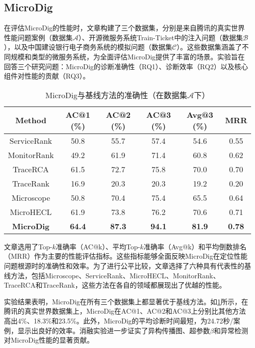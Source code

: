 \subsection{MicroDig}

在评估MicroDig的性能时，文章构建了三个数据集，分别是来自腾讯的真实世界性能问题案例（数据集$\mathcal{A}$）、开源微服务系统Train-Ticket中的注入问题（数据集$\mathcal{B}$），以及中国建设银行电子商务系统的模拟问题（数据集$\mathcal{C}$）。这些数据集涵盖了不同规模和类型的微服务系统，为全面评估MicroDig提供了丰富的场景。实验旨在回答三个研究问题：MicroDig的诊断准确性（RQ1）、诊断效率（RQ2）以及核心组件对性能的贡献（RQ3）。

\begin{table}[ht]
    \centering
    \caption{MicroDig与基线方法的准确性（在数据集$\mathcal{A}$下）}
    \label{table:the accuracy of microdig and the baseline methods A}
    \begin{tabular}{cccccc}
        \toprule
        \textbf{Method} & \textbf{AC@1 (\%)} & \textbf{AC@2 (\%)} & \textbf{AC@3 (\%)} & \textbf{Avg@3 (\%)} & \textbf{MRR} \\
        \midrule
        ServiceRank         & 50.8 & 55.7 & 57.4 & 54.6 & 0.55 \\
        MonitorRank         & 49.2 & 61.9 & 71.4 & 60.8 & 0.62 \\
        TraceRCA            & 61.5 & 72.7 & 75.8 & 70.0 & 0.70 \\
        TraceRank           & 16.9 & 20.3 & 20.3 & 19.2 & 0.20 \\
        Microscope          & 50.8 & 70.4 & 75.4 & 65.5 & 0.64 \\
        MicroHECL           & 61.9 & 73.8 & 76.2 & 70.6 & 0.71 \\
        \textbf{MicroDig}   & \textbf{64.4} & \textbf{87.3} & \textbf{94.1} & \textbf{81.9} & \textbf{0.78} \\
        \bottomrule
    \end{tabular}
\end{table}

文章选用了Top-$k$准确率（AC@k）、平均Top-$k$准确率（Avg@k）和平均倒数排名（MRR）作为主要的性能评估指标。这些指标能够全面反映MicroDig在定位性能问题根源时的准确性和效率。为了进行公平比较，文章选择了六种具有代表性的基线方法，包括Microscope、ServiceRank、MicroHECL、MonitorRank、TraceRCA和TraceRank，这些方法在各自的领域都展现出了优越的性能。

实验结果表明，MicroDig在所有三个数据集上都显著优于基线方法。如\cref{table:the accuracy of microdig and the baseline methods A}所示，在腾讯的真实世界数据集上，MicroDig在AC@1、AC@2和AC@3上分别比其他方法高出4\%、18.3\%和23.5\%。此外，MicroDig的平均诊断时间最短，为24.72秒/案例，显示出良好的效率。消融实验进一步证实了异构传播图、超参数$\beta$和异常检测对MicroDig性能的显著贡献。